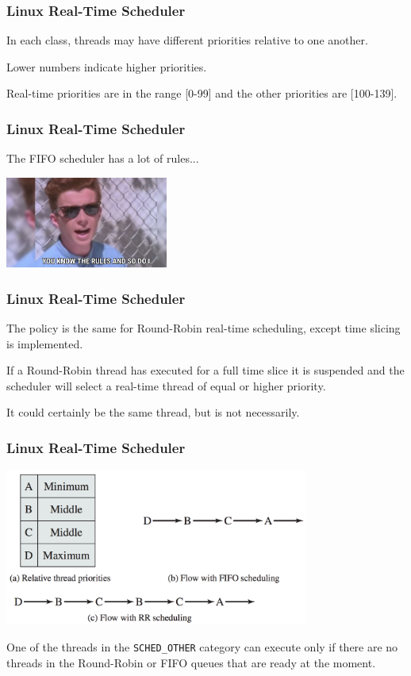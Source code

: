 \begin{frame}
\frametitle{Linux Real-Time Scheduler}

In each class, threads may have different priorities relative to one another. 

Lower numbers indicate higher priorities. 

Real-time priorities are in the range [0-99] and the other priorities are [100-139].

\end{frame}

\begin{frame}
\frametitle{Linux Real-Time Scheduler}

The FIFO scheduler has a lot of rules...

\begin{center}
	\includegraphics[width=0.4\textwidth]{images/therules.jpg}
\end{center}

\end{frame}

\begin{frame}
\frametitle{Linux Real-Time Scheduler}

The policy is the same for Round-Robin real-time scheduling, except time slicing is implemented. 

If a Round-Robin thread has executed for a full time slice it is suspended and the scheduler will select a real-time thread of equal or higher priority.

It could certainly be the same thread, but is not necessarily. 

\end{frame}

\begin{frame}
\frametitle{Linux Real-Time Scheduler}

\begin{center}
	\includegraphics[width=0.75\textwidth]{images/linux-rts.png}
\end{center}

One of the threads in the \texttt{SCHED\_OTHER} category can execute only if there are no threads in the Round-Robin or FIFO queues that are ready at the moment.


\end{frame}

